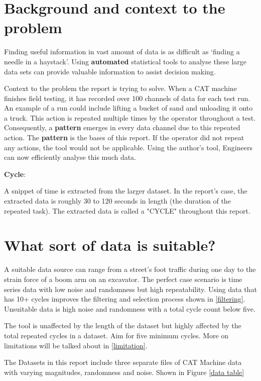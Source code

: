 \raggedright
\section{Background and context to the problem}
Finding useful information in vast amount of data is as difficult as `finding a needle in a haystack'. Using \textbf{automated} statistical tools to analyse these large data sets can provide valuable information to assist decision making.

Context to the problem the report is trying to solve. When a CAT machine finishes field testing, it has recorded over 100 channels of data for each test run. An example of a run could include lifting a bucket of sand and unloading it onto a truck. This action is repeated multiple times by the operator throughout a test. Consequently, a \textbf{pattern} emerges in every data channel due to this repeated action. The \textbf{pattern} is the bases of this report. If the operator did not repeat any actions, the tool would not be applicable. 
Using the author's tool, Engineers can now efficiently analyse this much data. 

\textbf{Cycle}:

A snippet of time is extracted from the larger dataset. In the report's case, the extracted data is roughly 30 to 120 seconds in length (the duration of the repeated task). The extracted data is called a "CYCLE" throughout this report.

\section{What sort of data is suitable?}
A suitable data source can range from a street's foot traffic during one day to the strain force of a boom arm on an excavator. 
The perfect case scenario is time series data with low noise and randomness but high repeatability. Using data that has 10+ cycles improves the filtering and selection process shown in \ref{filtering}. Unsuitable data is high noise and randomness with a total cycle count below five. 

The tool is unaffected by the length of the dataset but highly affected by the total repeated cycles in a dataset. Aim for five minimum cycles. More on limitations will be talked about in \ref{limitation}.

The Datasets in this report include three separate files of CAT Machine data with varying magnitudes, randomness and noise. Shown in Figure \ref{data table}

